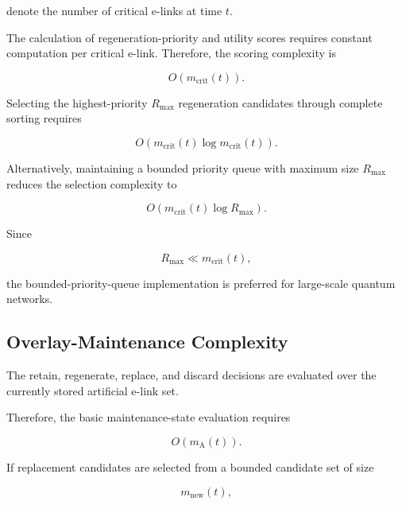 denote the number of critical e-links at time $t$.

The calculation of regeneration-priority and utility scores requires constant computation per critical e-link. Therefore, the scoring complexity is

\begin{equation}
    O
    \left(
    m_{\mathrm{crit}}(t)
    \right).
\end{equation}

Selecting the highest-priority $R_{\max}$ regeneration candidates through complete sorting requires

\begin{equation}
    O
    \left(
    m_{\mathrm{crit}}(t)
    \log
    m_{\mathrm{crit}}(t)
    \right).
\end{equation}

Alternatively, maintaining a bounded priority queue with maximum size $R_{\max}$ reduces the selection complexity to

\begin{equation}
    O
    \left(
    m_{\mathrm{crit}}(t)
    \log
    R_{\max}
    \right).
\end{equation}

Since

\begin{equation}
    R_{\max}
    \ll
    m_{\mathrm{crit}}(t),
\end{equation}

the bounded-priority-queue implementation is preferred for large-scale quantum networks.

\subsection{Overlay-Maintenance Complexity}

The retain, regenerate, replace, and discard decisions are evaluated over the currently stored artificial e-link set.

Therefore, the basic maintenance-state evaluation requires

\begin{equation}
    O
    \left(
    m_{\mathrm{A}}(t)
    \right).
\end{equation}

If replacement candidates are selected from a bounded candidate set of size

\begin{equation}
    m_{\mathrm{new}}(t),
\end{equation}

